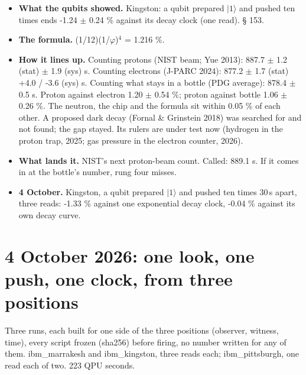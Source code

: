 \documentclass[11pt]{article}
\begin{document}
\begin{itemize}
\item \textbf{What the qubits showed.} Kingston: a qubit prepared \(|1\rangle\) and pushed ten times ends -1.24 \(\pm\) 0.24 \% against its decay clock (one read). \S{} 153.
\item \textbf{The formula.} (1/12)(1/\(\varphi\))\(^{4}\) = 1.216 \%.
\item \textbf{How it lines up.} Counting protons (NIST beam; Yue 2013): 887.7 \(\pm\) 1.2 (stat) \(\pm\) 1.9 (sys) s. Counting electrons (J-PARC 2024): 877.2 \(\pm\) 1.7 (stat) +4.0 / -3.6 (sys) s. Counting what stays in a bottle (PDG average): 878.4 \(\pm\) 0.5 s. Proton against electron 1.20 \(\pm\) 0.54 \%; proton against bottle 1.06 \(\pm\) 0.26 \%. The neutron, the chip and the formula sit within 0.05 \% of each other. A proposed dark decay (Fornal \& Grinstein 2018) was searched for and not found; the gap stayed. Its rulers are under test now (hydrogen in the proton trap, 2025; gas pressure in the electron counter, 2026).
\item \textbf{What lands it.} NIST's next proton-beam count. Called: 889.1 s. If it comes in at the bottle's number, rung four misses.
\item \textbf{4 October.} Kingston, a qubit prepared \(|1\rangle\) and pushed ten times 30\,\textmu s apart, three reads: -1.33 \% against one exponential decay clock, -0.04 \% against its own decay curve.
\end{itemize}
\section{4 October 2026: one look, one push, one clock, from three positions}
Three runs, each built for one side of the three positions (observer, witness, time), every script frozen (sha256) before firing, no number written for any of them. ibm\_marrakesh and ibm\_kingston, three reads each; ibm\_pittsburgh, one read each of two. 223 QPU seconds.
\end{document}
